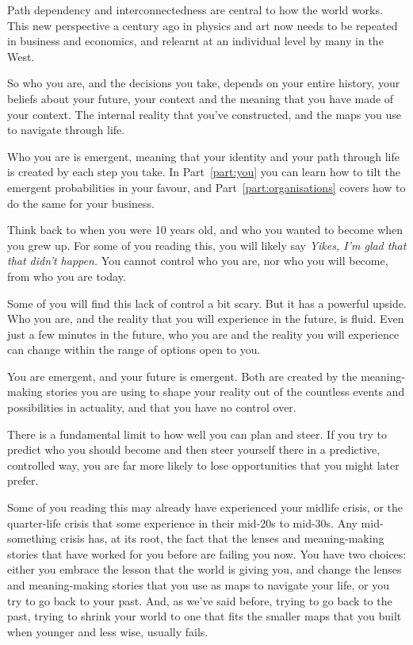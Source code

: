 Path dependency and interconnectedness are central to  how the world works. This new perspective a century ago in physics and art now needs to be repeated in business and economics, and relearnt at an individual level by many in the West. 


So who you are, and the decisions you take, depends on your entire history, your beliefs about your future, your context and the meaning that you have made of your context. The internal reality that you've constructed, and the maps you use to navigate through life. 


Who you are is emergent, meaning that your identity and your path through life is created by each step you take. In Part~\ref{part:you} you can learn how to tilt the emergent probabilities in your favour, and Part~\ref{part:organisations} covers how to do the same for your business.


Think back to when you were 10 years old, and who you wanted to become when you grew up. For some of you reading this, you will likely say \emph{Yikes, I'm glad that that didn't happen.} You cannot control who you are, nor who you will become, from who you are today. 


Some of you will find this lack of control a bit scary. But it has a powerful upside. Who you are, and the reality that you will experience in the future, is fluid. Even just a few minutes in the future, who you are and the reality you will experience can change within the range of options open to you.


You are emergent, and your future is emergent. Both are created by the meaning\hyp{}making stories you are using to shape your reality out of the countless events and possibilities in actuality, and that you have no control over.


There is a fundamental limit to how well you can plan and steer. If you try to predict who you should become and then steer yourself there in a predictive, controlled way, you are far more likely to lose opportunities that you might later prefer. 


Some of you reading this may already have experienced your midlife crisis, or the quarter-life crisis that some experience in their mid-20s to mid-30s. Any mid-something crisis has, at its root, the fact that the lenses and meaning\hyp{}making stories that have worked for you before are failing you now. You have two choices: either you embrace the lesson that the world is giving you, and change the lenses and meaning\hyp{}making stories that you use as maps to navigate your life, or you try to go back to your past. And, as we’ve said before, trying to go back to the past, trying to shrink your world to one that fits the smaller maps that you built when younger and less wise, usually fails.


